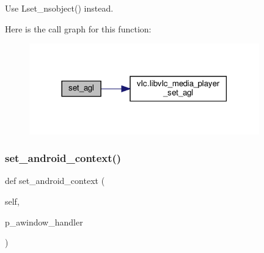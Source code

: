 \begin{DoxyVerb}\deprecated Use L{set_nsobject}() instead.
\end{DoxyVerb}
 Here is the call graph for this function\+:
\nopagebreak
\begin{figure}[H]
\begin{center}
\leavevmode
\includegraphics[width=282pt]{classvlc_1_1_media_player_ac4c4fcc49773eef53d5666f1c1365d71_cgraph}
\end{center}
\end{figure}
\mbox{\label{classvlc_1_1_media_player_aa5b3842814a612f4999f1bc01f95b6d4}} 
\subsubsection{\texorpdfstring{set\+\_\+android\+\_\+context()}{set\_android\_context()}}
{\footnotesize\ttfamily def set\+\_\+android\+\_\+context (\begin{DoxyParamCaption}\item[{}]{self,  }\item[{}]{p\+\_\+awindow\+\_\+handler }\end{DoxyParamCaption})}

